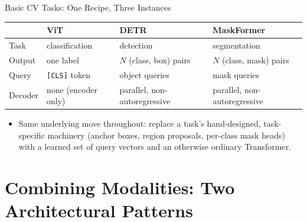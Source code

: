 \begin{vbframe}{Basic CV Tasks: One Recipe, Three Instances}
\begin{center}
\footnotesize
\begin{tabular}{@{}p{2.0cm}p{2.6cm}p{2.6cm}p{3.4cm}@{}}
\toprule
 & \textbf{ViT} & \textbf{DETR} & \textbf{MaskFormer} \\
\midrule
Task & classification & detection & segmentation \\
Output & one label & $N$ (class, box) pairs & $N$ (class, mask) pairs \\
Query & {\tt [CLS]} token & object queries & mask queries \\
Decoder & none (encoder only) & parallel, non-autoregressive & parallel, non-autoregressive \\
\bottomrule
\end{tabular}
\end{center}
\begin{itemize}
  \item Same underlying move throughout: replace a task's hand-designed, task-specific machinery (anchor boxes, region proposals, per-class mask heads) with a learned set of query vectors and an otherwise ordinary Transformer.
\end{itemize}
\end{vbframe}


\section{Combining Modalities: Two Architectural Patterns}


